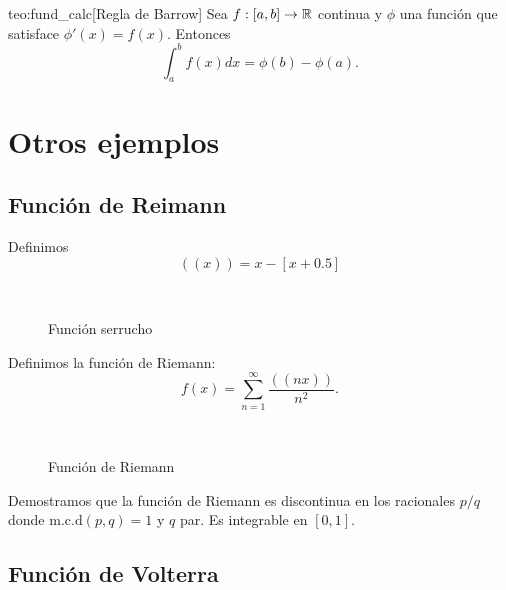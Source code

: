 \begin{corolario}{teo:fund_calc}[Regla de Barrow]
 Sea $f:[a,b]\to\mathbb{R}$ continua y $\phi$ una función que satisface $\phi'(x)=f(x)$. Entonces
 \begin{equation}\label{eq:barrow}
  \int_a^{b}f(x)dx=\phi(b)-\phi(a).
 \end{equation}
\end{corolario}


\iffalse

\section{Otros ejemplos}

\subsection{Función de Reimann}




\begin{ejemplo}{} Definimos
\[
 ((x))=x-[x+0.5]
\]

\begin{figure}[H]
\begin{center}
\\
 \caption{Función serrucho}
\end{center}
 \end{figure}


Definimos la función de Riemann:
\[
 f(x)=\sum_{n=1}^{\infty}\frac{((nx))}{n^2}.
\]

\begin{figure}[H]
\begin{center}
\\
\caption{Función de Riemann}
 \end{center}
 \end{figure}
 
Demostramos que la función de Riemann es discontinua en los racionales $p/q$ donde $\text{m.c.d}(p,q)=1$ y $q$ par. Es integrable en $[0,1]$.  
 
\end{ejemplo}


\subsection{Función de Volterra}

